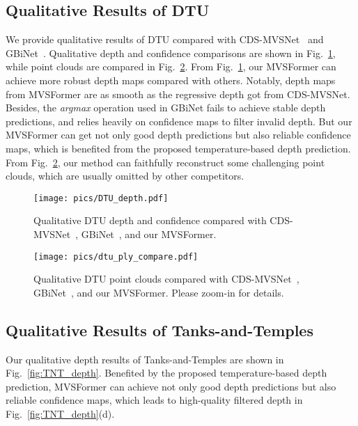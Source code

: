 \documentclass[10pt]{article} \usepackage[preprint]{tmlr}
\begin{document}
\subsection{Qualitative Results of DTU}
\label{sec:appendix_qualitative_dtu}

We provide qualitative results of DTU compared with CDS-MVSNet~\citep{giang2021curvature} and GBiNet~\citep{mi2021generalized}. Qualitative depth and confidence comparisons are shown in Fig.~\ref{fig:dtu_depth_qualitative}, while point clouds are compared in Fig.~\ref{fig:dtu_ply_compare}.
From Fig.~\ref{fig:dtu_depth_qualitative}, our MVSFormer can achieve more robust depth maps compared with others. 
Notably, depth maps from MVSFormer are as smooth as the regressive depth got from CDS-MVSNet. Besides, the \emph{argmax} operation used in GBiNet fails to achieve stable depth predictions, and relies heavily on confidence maps to filter invalid depth. But our MVSFormer can get not only good depth predictions but also reliable confidence maps, which is benefited from the proposed temperature-based depth prediction.
From Fig.~\ref{fig:dtu_ply_compare}, our method can faithfully reconstruct some challenging point clouds, which are usually omitted by other competitors.

\begin{figure}[h]
\begin{centering}
\texttt{[image: pics/DTU\_depth.pdf]} 
\par\end{centering}
\caption{Qualitative DTU depth and confidence compared with CDS-MVSNet~\citep{giang2021curvature}, GBiNet~\citep{mi2021generalized}, and our MVSFormer.}
\label{fig:dtu_depth_qualitative}
\vspace{-0.15in}
\end{figure}

\begin{figure}[h]
\begin{centering}
\texttt{[image: pics/dtu\_ply\_compare.pdf]} 
\par\end{centering}
\caption{Qualitative DTU point clouds compared with CDS-MVSNet~\citep{giang2021curvature}, GBiNet~\citep{mi2021generalized}, and our MVSFormer. Please zoom-in for details.}
\label{fig:dtu_ply_compare}
\vspace{-0.15in}
\end{figure}

\subsection{Qualitative Results of Tanks-and-Temples}
\label{sec:appendix_qualitative_tanks}
Our qualitative depth results of Tanks-and-Temples are shown in Fig.~\ref{fig:TNT_depth}. Benefited by the proposed temperature-based depth prediction, MVSFormer can achieve not only good depth predictions but also reliable confidence maps, which leads to high-quality filtered depth in Fig.~\ref{fig:TNT_depth}(d).
\end{document}
